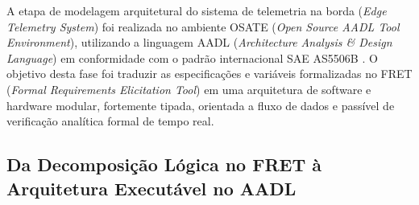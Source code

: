 A etapa de modelagem arquitetural do sistema de telemetria na borda (\textit{Edge Telemetry System}) foi realizada no ambiente OSATE (\textit{Open Source AADL Tool Environment}), utilizando a linguagem AADL (\textit{Architecture Analysis \& Design Language}) em conformidade com o padrão internacional SAE AS5506B \cite{sae2017aadl,feiler2012}. O objetivo desta fase foi traduzir as especificações e variáveis formalizadas no FRET (\textit{Formal Requirements Elicitation Tool}) em uma arquitetura de software e hardware modular, fortemente tipada, orientada a fluxo de dados e passível de verificação analítica formal de tempo real.

\subsection{Da Decomposição Lógica no FRET à Arquitetura Executável no AADL}
\label{subsec:fret_to_aadl}

